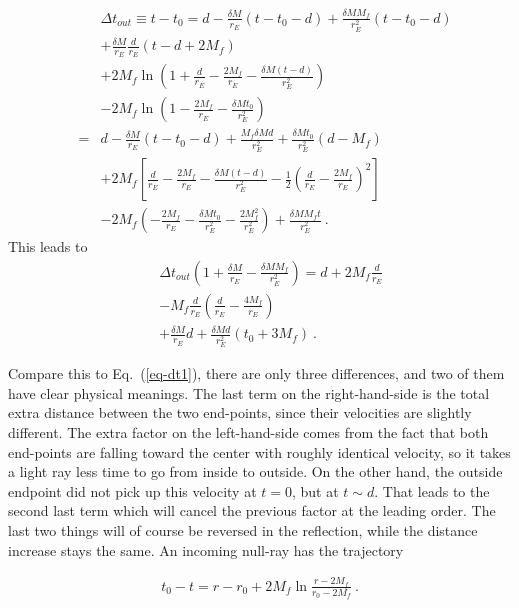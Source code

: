 \documentclass[aps,showpacs,twocolumn,floats,prd,superscriptaddress,nofootinbib]{revtex4-1}
\begin{document}
\begin{eqnarray}
& & \Delta t_{out} \equiv  t - t_0 = d - \frac{\delta M}{r_E}(t - t_0 - d) + \frac{\delta M M_f}{r_E^2} (t - t_0 -d)	\nonumber	\\
&  & + \frac{\delta M}{r_E}\frac{d}{r_E}(t-d+2M_f) \label{eq-SolveCross} \nonumber	\\
& & + 2M_f\ln\left(1+\frac{d}{r_E}-\frac{2M_f}{r_E} -\frac{\delta M(t-d)}{r_E^2} \right) 
\nonumber \\ \nonumber
& & - 2M_f\ln\left(1-\frac{2M_f}{r_E} -\frac{\delta Mt_0}{r_E^2} \right)
\\ \nonumber
&=& d - \frac{\delta M}{r_E}(t - t_0 - d) + \frac{M_f \delta M d}{r_E^2} + \frac{\delta M t_0}{r_E^2}(d-M_f) \\ \nonumber
& & + 2M_f \left[ \frac{d}{r_E}-\frac{2M_f}{r_E} -\frac{\delta M(t-d)}{r_E^2}  - \frac{1}{2} \left( \frac{d}{r_E}-\frac{2M_f}{r_E} \right)^2 \right] \\ \nonumber
& & - 2M_f \left( -\frac{2M_f}{r_E} -\frac{\delta Mt_0}{r_E^2} - \frac{2M_f^2}{r_E^2} \right) + \frac{\delta M M_f t}{r_E^2} ~.
\end{eqnarray}
This leads to
\begin{eqnarray}
& & \Delta t_{out} \left(1 + \frac{\delta M}{r_E} - \frac{\delta M M_f}{r_E^2}\right) = 
d + 2M_f\frac{d}{r_E}  \nonumber	\\
& & - M_f\frac{d}{r_E} \left( \frac{d}{r_E}-\frac{4M_f}{r_E} \right) 	\nonumber	\\
& & + \frac{\delta M}{r_E}d + \frac{\delta Md}{r_E^2} (t_0+3M_f)~.
\end{eqnarray}

Compare this to Eq.~(\ref{eq-dt1}), there are only three differences, and two of them have clear physical meanings. The last term on the right-hand-side is the total extra distance between the two end-points, since their velocities are slightly different. The extra factor on the left-hand-side comes from the fact that both end-points are falling toward the center with roughly identical velocity, so it takes a light ray less time to go from inside to outside. On the other hand, the outside endpoint did not pick up this velocity at $t=0$, but at $t\sim d$. That leads to the second last term which will cancel the previous factor at the leading order. The last two things will of course be reversed in the reflection, while the distance increase stays the same. An incoming null-ray has the trajectory

\begin{eqnarray}
t_0 - t = r-r_0 + 2M_f\ln\frac{r-2M_f}{r_0-2M_f}~.
\end{eqnarray}
\end{document}
